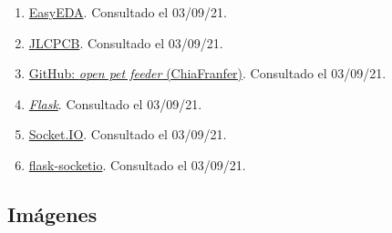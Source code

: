 \documentclass[12pt]{article}
\begin{document}
\begin{enumerate}
			\item
			\label{easyeda web}
			\href{https://easyeda.com/es}{EasyEDA}. Consultado el 03/09/21.
			
			\item
			\label{jlcpcb web}
			\href{https://jlcpcb.com/}{JLCPCB}. Consultado el 03/09/21.
			
			\item
			\label{github repo}
			\href{https://github.com/ChiaFranfer/open-pet-feeder}{GitHub: \textit{open pet feeder} (ChiaFranfer)}. Consultado el 03/09/21.
			
			\item
			\label{flask web}
			\href{https://flask.palletsprojects.com/en/2.0.x/}{\textit{Flask}}. Consultado el 03/09/21.
			
			\item
			\label{socketio}
			\href{https://socket.io/}{Socket.IO}. Consultado el 03/09/21.
			
			\item
			\label{flask socketio}
			\href{https://flask-socketio.readthedocs.io/en/latest/}{flask-socketio}. Consultado el 03/09/21.
			
		\end{enumerate}
		
		\subsection*{Imágenes}
		
\end{document}
